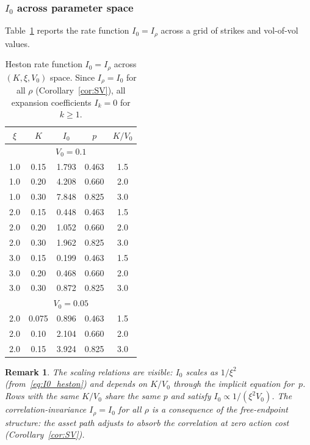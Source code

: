 \documentclass[11pt]{article}
\newtheorem{remark}[theorem]{Remark}
\theoremstyle{definition}
\begin{document}
\subsubsection{$I_0$ across parameter space}

Table~\ref{tab:heston_coefficients} reports the rate function $I_0 = I_\rho$ across a grid of strikes and vol-of-vol values.

\begin{table}[h]
\centering
\caption{Heston rate function $I_0 = I_\rho$ across $(K, \xi, V_0)$ space. Since $I_\rho = I_0$ for all $\rho$ (Corollary~\ref{cor:SV}), all expansion coefficients $I_k = 0$ for $k \geq 1$.}\label{tab:heston_coefficients}
\begin{tabular}{cc|ccc}
\hline
$\xi$ & $K$ & $I_0$ & $p$ & $K/V_0$ \\
\hline
\multicolumn{5}{c}{$V_0 = 0.1$} \\
\hline
1.0 & 0.15 & 1.793 & 0.463 & 1.5 \\
1.0 & 0.20 & 4.208 & 0.660 & 2.0 \\
1.0 & 0.30 & 7.848 & 0.825 & 3.0 \\
\hline
2.0 & 0.15 & 0.448 & 0.463 & 1.5 \\
2.0 & 0.20 & 1.052 & 0.660 & 2.0 \\
2.0 & 0.30 & 1.962 & 0.825 & 3.0 \\
\hline
3.0 & 0.15 & 0.199 & 0.463 & 1.5 \\
3.0 & 0.20 & 0.468 & 0.660 & 2.0 \\
3.0 & 0.30 & 0.872 & 0.825 & 3.0 \\
\hline
\multicolumn{5}{c}{$V_0 = 0.05$} \\
\hline
2.0 & 0.075 & 0.896 & 0.463 & 1.5 \\
2.0 & 0.10 & 2.104 & 0.660 & 2.0 \\
2.0 & 0.15 & 3.924 & 0.825 & 3.0 \\
\hline
\end{tabular}
\end{table}

\begin{remark}
The scaling relations are visible: $I_0$ scales as $1/\xi^2$ (from~\eqref{eq:I0_heston}) and depends on $K/V_0$ through the implicit equation for~$p$. Rows with the same $K/V_0$ share the same $p$ and satisfy $I_0 \propto 1/(\xi^2 V_0)$. The correlation-invariance $I_\rho = I_0$ for all $\rho$ is a consequence of the free-endpoint structure: the asset path adjusts to absorb the correlation at zero action cost (Corollary~\ref{cor:SV}).
\end{remark}
\end{document}
